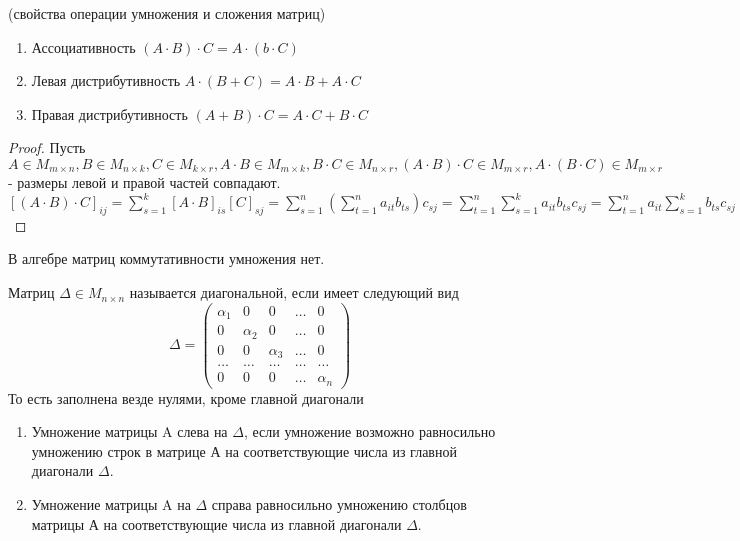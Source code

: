	\begin{theorem}
		(свойства операции умножения и сложения матриц)
		\begin{enumerate}
			\item Ассоциативность \((A\cdot B)\cdot C = A\cdot(b\cdot C)\)
			\item Левая дистрибутивность \(A\cdot(B+C) = A\cdot B + A\cdot C\)
			\item Правая дистрибутивность \((A+B)\cdot C = A\cdot C + B\cdot C\)
		\end{enumerate}
		\begin{proof}
			Пусть \(A\in M_{m\times n}, B\in M_{n\times k}, C\in M_{k\times r}, A\cdot B\in M_{m\times k}, B\cdot C \in M_{n\times r}, (A\cdot B)\cdot C\in M_{m\times r}, A\cdot (B\cdot C)\in M_{m\times r}\) - размеры левой и правой частей совпадают. \\
			\([(A\cdot B)\cdot C]_{ij} = \sum_{s=1}^{k}[A\cdot B]_{is}[C]_{sj} = \sum_{s=1}^{n}(\sum_{t=1}^{n}a_{it}b_{ts})c_{sj} = \sum_{t=1}^{n}\sum_{s=1}^{k}a_{it}b_{ts}c_{sj} = \sum_{t=1}^{n}a_{it}\sum_{s=1}^{k}b_{ts}c_{sj} = \sum_{t=1}^{n}a_{it}[B\cdot C]_{tj} = [A\cdot(B\cdot C)]_{ij}\)
		\end{proof}
	\end{theorem}
	\begin{note}
		В алгебре матриц коммутативности умножения нет.
	\end{note}
	\begin{definition}
		Матриц \(\Delta \in M_{n\times n}\) называется диагональной, если имеет следующий вид \\
		\[\Delta = 
		\begin{pmatrix}
			\alpha_1 & 0 & 0 & \ldots & 0 \\
			0 & \alpha_2 & 0 & \ldots & 0 \\
			0 & 0 & \alpha_3 & \ldots & 0 \\
			\ldots & \ldots & \ldots & \ldots & \ldots \\
			0 & 0 & 0 & \ldots & \alpha_n 
			
		\end{pmatrix}\]
		То есть заполнена везде нулями, кроме главной диагонали
	\end{definition}
	\begin{proposition}
		\begin{enumerate}
			\item Умножение матрицы A слева на \(\Delta\), если умножение возможно равносильно умножению строк в матрице А на соответствующие числа из главной диагонали \(\Delta\).
			\item Умножение матрицы A на \(\Delta\) справа равносильно умножению столбцов матрицы А на соответствующие числа из главной диагонали \(\Delta\).
		\end{enumerate}
		
	\end{proposition}

